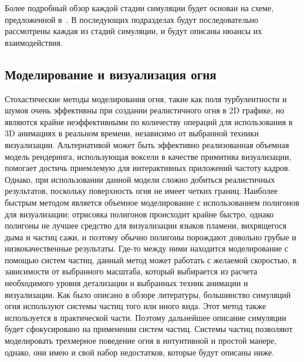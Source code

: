 Более подробный обзор каждой стадии симуляции будет основан на схеме,
предложенной в~\cite{realistic_sim}. В последующих подразделах будут
последовательно рассмотрены каждая из стадий симуляции, и будут описаны нюансы
их взаимодействия.

\subsection{Моделирование и визуализация огня}%
\label{sec:modellingAndRendering}

Стохастические методы моделирования огня, такие как поля турбулентности и шумов
очень эффективны при создании реалистичного огня в 2D графике, но являются
крайне неэффективными по количеству операций для использования в 3D анимациях в
реальном времени, независимо от выбранной техники визуализации. Альтернативой
может быть эффективно реализованная объемная модель рендеринга, использующая
воксели в качестве примитива визуализации, помогает достичь приемлемую для
интерактивных приложений частоту кадров. Однако, при использовании данной модели
сложно добиться реалистичных результатов, поскольку поверхность огня не имеет
четких границ. Наиболее быстрым методом является объемное моделирование с
использованием полигонов для визуализации; отрисовка полигонов происходит крайне
быстро, однако полигоны не лучшее средство для визуализации языков пламени,
вихрящегося дыма и частиц сажи, и поэтому обычно полигоны порождают довольно
грубые и низкокачественные результаты. Где-то между ними находится моделирование
с помощью систем частиц, данный метод может работать с желаемой скоростью, в
зависимости от выбранного масштаба, который выбирается из расчета необходимого
уровня детализации и выбранных техник анимации и визуализации. Как было описано
в обзоре литературы, большинство симуляций огня используют системы частиц того
или иного вида. Этот метод также используется в практической части. Поэтому
дальнейшее описание симуляции будет сфокусировано на применении систем частиц.
Системы частиц позволяют моделировать трехмерное поведение огня в интуитивной и
простой манере, однако, они имею и свой набор недостатков, которые будут описаны
ниже.


